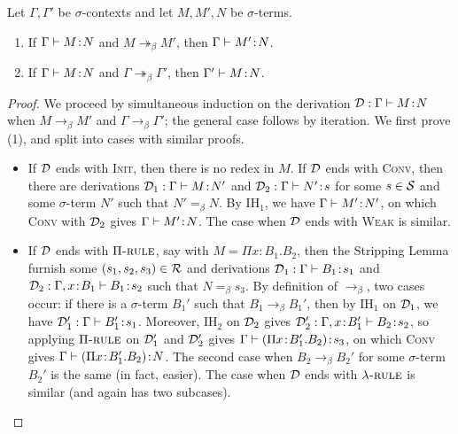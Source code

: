 \documentclass[reqno, twoside]{article}
\begin{document}
    \begin{theorem}
        Let $\Gamma,\Gamma'$ be $\sigma$-contexts and let $M,M',N$ be $\sigma$-terms.
        \begin{enumerate}
            \item If $\Gamma\vdash M\!:\!N$ and $M\twoheadrightarrow_\beta M'$, then $\Gamma\vdash M'\!:\! N$.
                \vspace{-0.05in}
            \item If $\Gamma\vdash M\!:\!N$ and $\Gamma\twoheadrightarrow_\beta\Gamma'$, then $\Gamma'\vdash M\!:\! N$.
        \end{enumerate}
    \end{theorem}
    \begin{proof}
        We proceed by simultaneous induction on the derivation $\mathcal{D}:\Gamma\vdash M\!:\!N$ when $M\rightarrow_\beta M'$ and $\Gamma\rightarrow_\beta\Gamma'$; the general case follows by iteration. We first prove (1), and split into cases with similar proofs.
        \begin{itemize}\small\vspace{-0.05in}
            \item If $\mathcal{D}$ ends with \textsc{Init}, then there is no redex in $M$. If $\mathcal{D}$ ends with \textsc{Conv}, then there are derivations $\mathcal{D}_1:\Gamma\vdash M\!:\!N'$ and $\mathcal{D}_2:\Gamma\vdash N'\!:\! s$ for some $s\in\mathcal{S}$ and some $\sigma$-term $N'$ such that $N'=_\beta N$. By $\mathrm{IH}_1$, we have $\Gamma\vdash M'\!:\!N'$, on which \textsc{Conv} with $\mathcal{D}_2$ gives $\Gamma\vdash M'\!:\!N$. The case when $\mathcal{D}$ ends with \textsc{Weak} is similar.
                \vspace{-0.05in}
            \item If $\mathcal{D}$ ends with $\Pi{\normalfont\textsc{-rule}}$, say with $M=\Pi x\!:\!B_1.B_2$, then the Stripping Lemma furnish some $(s_1,s_2,s_3)\in\mathcal{R}$ and derivations $\mathcal{D}_1:\Gamma\vdash B_1\!:\!s_1$ and $\mathcal{D}_2:\Gamma,x\!:\!B_1\vdash B_1\!:\!s_2$ such that $N=_\beta s_3$. By definition of $\rightarrow_\beta$, two cases occur: if there is a $\sigma$-term $B_1'$ such that $B_1\rightarrow_\beta B_1'$, then by $\mathrm{IH}_1$ on $\mathcal{D}_1$, we have $\mathcal{D}'_1:\Gamma\vdash B_1'\!:\!s_1$. Moreover, $\mathrm{IH}_2$ on $\mathcal{D}_2$ gives $\mathcal{D}'_2:\Gamma,x\!:\!B_1'\vdash B_2\!:\!s_2$, so applying $\Pi{\normalfont\textsc{-rule}}$ on $\mathcal{D}'_1$ and $\mathcal{D}'_2$ gives $\Gamma\vdash(\Pi x\!:\!B_1'.B_2)\!:\!s_3$, on which \textsc{Conv} gives $\Gamma\vdash(\Pi x\!:\!B_1'.B_2)\!:\!N$. The second case when $B_2\rightarrow_\beta B_2'$ for some $\sigma$-term $B_2'$ is the same (in fact, easier). The case when $\mathcal{D}$ ends with $\lambda{\normalfont\textsc{-rule}}$ is similar (and again has two subcases).

\end{itemize}
\end{proof}
\end{document}
